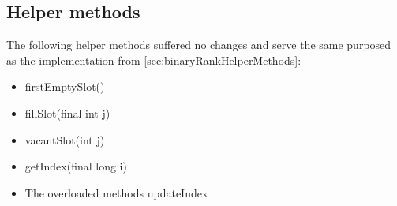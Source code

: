 \subsection{Helper methods} \label{sec:dontCaresRankHelperMethods}

The following helper methods suffered no changes and serve the same purposed as the implementation from \ref{sec:binaryRankHelperMethods}:
\begin{itemize}
    \item
    {\ttfamily firstEmptySlot()}
    
    \item
    {\ttfamily fillSlot(final int j)}
    
    \item
    {\ttfamily vacantSlot(int j)}
    
    \item
    {\ttfamily getIndex(final long i)}
    
    \item
    The overloaded methods {\ttfamily updateIndex}
\end{itemize}

